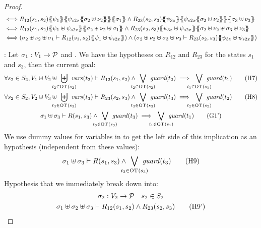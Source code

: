\documentclass{article}
\begin{document}
\begin{proof}
\begin{align*}
		\iff & R_{12}\mpar{s_1, s_2}\psubst{\psi_1}\psubst{\psi_{s2x}\psubst{\sigma_2 \uplus \nu_2}}\psubst{\sigma_1} \wedge R_{23}\mpar{s_2, s_3}\psubst{\psi_{3z}}\psubst{\psi_{s2x}\psubst{\sigma_2 \uplus \nu_2}}\psubst{\sigma_3 \uplus \nu_3} \\
		\iff & R_{12}\mpar{s_1, s_2}\psubst{\psi_1 \uplus \psi_{s2x}}\psubst{\sigma_2 \uplus \nu_2 \uplus \sigma_1} \wedge R_{23}\mpar{s_2, s_3}\psubst{\psi_{3z} \uplus \psi_{s2x}}\psubst{\sigma_2 \uplus \nu_2 \uplus \sigma_3 \uplus \nu_3} \\
		\iff & \mpar{\sigma_2 \uplus \nu_2 \uplus \sigma_1 \vdash R_{12}\mpar{s_1, s_2}\psubst{\psi_1 \uplus \psi_{s2x}}} \wedge \mpar{\sigma_2 \uplus \nu_2 \uplus \sigma_3 \uplus \nu_3 \vdash R_{23}\mpar{s_2, s_3}\psubst{\psi_{3z} \uplus \psi_{s2x}}}
	\end{align*}
\item[\goal{1}:] Let \(\sigma_1: V_1 \to \mathcal{P}\) and .
	We have the hypotheses on \(R_{12}\) and \(R_{23}\) for the states \(s_1\) and \(s_3\), then the current goal:
	\begin{gather}
		\forall s_2 \in S_2, V_1 \uplus V_2 \uplus \biguplus_\subbox{t_2 \in \fOT{s_2}} \fvars{t_2} \vdash R_{12}\mpar{s_1, s_2} \wedge \bigvee_\subbox{t_2 \in \fOT{s_2}} \fguard{t_2} \implies \bigvee_\subbox{t_1 \in \fOT{s_1}} \fguard{t_1} \hyp{7} \\
		\forall s_2 \in S_2, V_2 \uplus V_3 \uplus \biguplus_\subbox{t_3 \in \fOT{s_3}} \fvars{t_3} \vdash R_{23}\mpar{s_2, s_3} \wedge \bigvee_\subbox{t_3 \in \fOT{s_3}} \fguard{t_3} \implies \bigvee_\subbox{t_2 \in \fOT{s_2}} \fguard{t_2} \hyp{8} \\
		\sigma_1 \uplus \sigma_3 \vdash R\mpar{s_1, s_3} \wedge \bigvee_\subbox{t_3 \in \fOT{s_3}} \fguard{t_3} \implies \bigvee_\subbox{t_1 \in \fOT{s_1}} \fguard{t_1} \goal{1'}
	\end{gather}
	We use dummy values for variables in  to get the left side of this implication as an hypothesis (independent from these values):
	\[ \sigma_1 \uplus \sigma_3 \vdash R\mpar{s_1, s_3} \wedge \bigvee_\subbox{t_3 \in \fOT{s_3}} \fguard{t_3} \hyp{9} \]
	Hypothesis that we immediately break down into:
	\begin{gather*}
		\sigma_2: V_2 \to \values \quad s_2 \in S_2 \\
		\sigma_1 \uplus \sigma_2 \uplus \sigma_3 \vdash R_{12}\mpar{s_1, s_2} \wedge R_{23}\mpar{s_2, s_3} \hyp{9'} \\

\end{gather*}
\end{proof}
\end{document}
